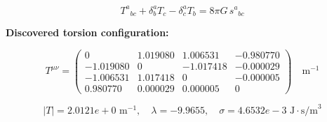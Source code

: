 
\begin{equation}
  T^a{}_{bc} + \delta^a_b T_c - \delta^a_c T_b = 8\pi G \, s^a{}_{bc}
\end{equation}

\textbf{Discovered torsion configuration:}

\begin{equation}
  T^{\mu\nu} = \begin{pmatrix}
    0 & 1.019080 & 1.006531 & -0.980770 \\
    -1.019080 & 0 & -1.017418 & -0.000029 \\
    -1.006531 & 1.017418 & 0 & -0.000005 \\
    0.980770 & 0.000029 & 0.000005 & 0
  \end{pmatrix} \quad \text{m}^{-1}
\end{equation}

\begin{equation}
  |T| = 2.0121e+0 \text{ m}^{-1}, \quad
  \lambda = -9.9655, \quad
  \sigma = 4.6532e-3 \text{ J}\cdot\text{s/m}^3
\end{equation}